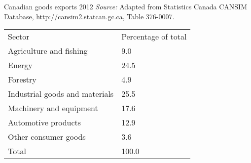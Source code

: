 \begin{Table}{25em}{Canadian goods exports 2012 \label{table:cdngoodsexports}}{\textit{Source:} Adapted from Statistics Canada CANSIM Database, \url{http://cansim2.statcan.gc.ca}, Table 376-0007.}
\begin{tabu} to 30em {|X[2.5,l]X[1,c]|}	\hline
{}	Sector								&	Percentage of total	\\
						Agriculture and fishing				&	9.0					\\
	Energy								&	24.5				\\
						Forestry							&	4.9					\\
	Industrial goods and materials		&	25.5				\\
						Machinery and equipment				&	17.6				\\
	Automotive products					&	12.9				\\
						Other consumer goods				&	3.6					\\
	Total								&	100.0				\\	\hline
\end{tabu}
\end{Table}